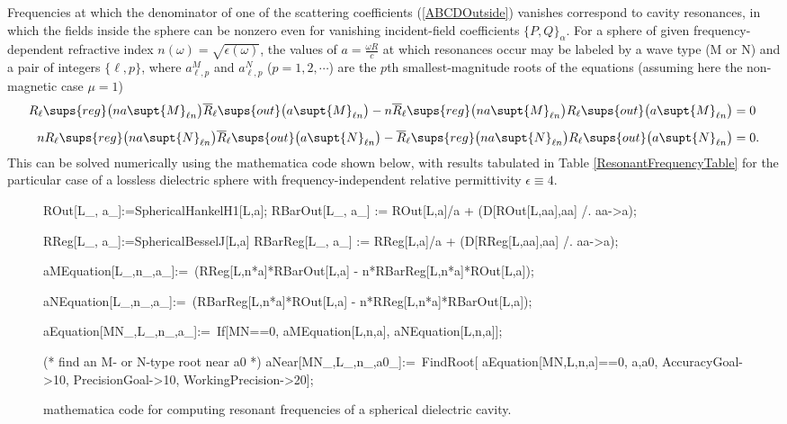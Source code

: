 \documentclass[letterpaper]{article}
\newcommand{\RBar}{\overline{R}}
\begin{document}
Frequencies at which the denominator of one of the
scattering coefficients (\ref{ABCDOutside}) vanishes
correspond to cavity resonances, in which the fields
inside the sphere can be nonzero even for vanishing
incident-field coefficients $\{P,Q\}_\alpha$.
For a sphere of given frequency-dependent 
refractive index
$n(\omega)=\sqrt{\epsilon(\omega)}$,
the values of
$a=\frac{\omega R}{c}$ at which resonances occur
may be labeled by a wave type (M or N) and a 
pair of integers $\{\ell, p\}$,
where $a^{M}_{\ell,p}$ and $a^{N}_{\ell, p}$
($p=1,2,\cdots$) are the $p$th smallest-magnitude roots of the 
equations (assuming here the non-magnetic case $\mu=1$)
\begin{align*}
   R_\ell\sups{reg}\big( n a\supt{M}_{\ell n} \big)
        \RBar_\ell\sups{out}\big(a\supt{M}_{\ell n}\big)
    - n \RBar_\ell\sups{reg}\big( n a\supt{M}_{\ell n} \big)
     R_\ell\sups{out}\big(a\supt{M}_{\ell n}\big)
&=0
\\[5pt]
  n R_\ell\sups{reg}\big( n a\supt{N}_{\ell n} \big)
        \RBar_\ell\sups{out}\big(a\supt{N}_{\ell n}\big)
    -  \RBar_\ell\sups{reg}\big( n a\supt{N}_{\ell n} \big)
     R_\ell\sups{out}\big(a\supt{N}_{\ell n}\big)
&=0.
\end{align*}
This can be solved numerically using the {\sc mathematica} code
shown below, with results tabulated in Table \ref{ResonantFrequencyTable}
for the particular case of a lossless dielectric
sphere with frequency-independent relative 
permittivity $\epsilon\equiv 4.$

\begin{figure}[h]
\begin{verbcode}
ROut[L_, a_]:=SphericalHankelH1[L,a];
RBarOut[L_, a_] := ROut[L,a]/a + (D[ROut[L,aa],aa] /. {aa->a});

RReg[L_, a_]:=SphericalBesselJ[L,a]
RBarReg[L_, a_] := RReg[L,a]/a + (D[RReg[L,aa],aa] /. {aa->a});

aMEquation[L_,n_,a_]:=\
 (RReg[L,n*a]*RBarOut[L,a] - n*RBarReg[L,n*a]*ROut[L,a]);

aNEquation[L_,n_,a_]:=\
 (RBarReg[L,n*a]*ROut[L,a] - n*RReg[L,n*a]*RBarOut[L,a]);

aEquation[MN_,L_,n_,a_]:=\
If[MN==0, aMEquation[L,n,a], aNEquation[L,n,a]];
 
(* find an M- or N-type root near a0 *)
aNear[MN_,L_,n_,a0_]:=\
 FindRoot[ aEquation[MN,L,n,a]==0, {a,a0}, AccuracyGoal->10,
                                           PrecisionGoal->10,
                                           WorkingPrecision->20];
\end{verbcode}
\caption{{\sc mathematica} code for computing resonant frequencies
         of a spherical dielectric cavity.}
\label{ResonantFrequencyMathCode}
\end{figure}
\end{document}
